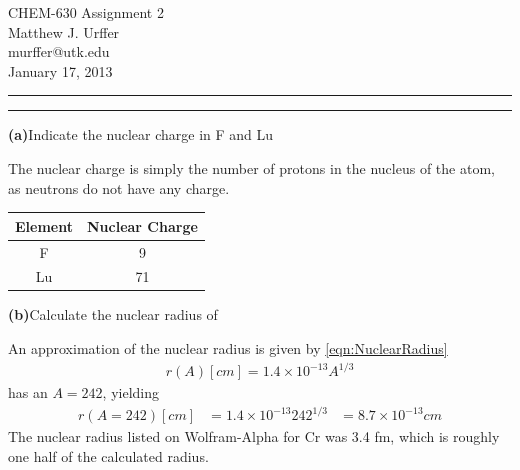 \documentclass[11pt]{article}
\makeatletter
\newcommand{\question}[2] {\vspace{.25in} \hrule\vspace{0.5em}
\noindent{\bf #1: #2} \vspace{0.5em}
\hrule \vspace{.10in}}
\renewcommand{\part}[1] {\vspace{.10in} {\bf (#1)}}
\newcommand{\myname}{Matthew J. Urffer}
\newcommand{\myemail}{murffer@utk.edu}
\newcommand{\myhwnum}{2}
\makeatother
\begin{document}
\medskip                        %

\thispagestyle{plain}
\begin{center}                  %
{\Large CHEM-630 Assignment \myhwnum} \\
\myname \\
\myemail \\
January 17, 2013 \\
\end{center}

\question{1.06}{Atoms}

\part{a}{Indicate the nuclear charge in F and Lu}

The nuclear charge is simply the number of protons in the nucleus of the atom, as neutrons do not have any charge.
\begin{center}
	\begin{tabular}{ c c}
	Element & Nuclear Charge \\
	\hline
	\hline
	F & 9 \\
	Lu & 71 \\
	\end{tabular}
\end{center}

\part{b}{Calculate the nuclear radius of }

An approximation of the nuclear radius is given by \ref{eqn:NuclearRadius}
\begin{align}
	r(A)[cm] = 1.4\times10^{-13}A^{1/3} 
	\label{eqn:NuclearRadius}
\end{align}
 has an $A=242$, yielding
\begin{align}
	r(A=242)[cm] &= 1.4\times10^{-13}242^{1/3} 
					 &= 8.7\times10^{-13} cm 
\end{align}
The nuclear radius listed on Wolfram-Alpha for Cr was 3.4 fm, which is roughly one half of the calculated radius.

\end{document}
